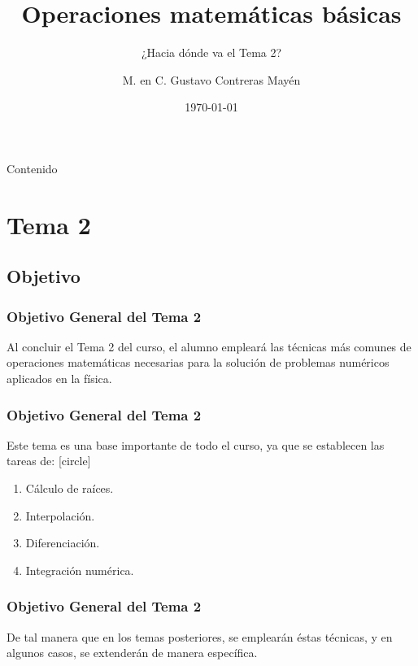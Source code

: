 



\makeatletter
\def\maketag@@@#1{\hbox{\m@th\normalfont\small#1}}
\makeatother
\title{\large{Operaciones matemáticas básicas}}
\subtitle{¿Hacia dónde va el Tema 2?}
\author{M. en C. Gustavo Contreras Mayén}
\date{\today}

\maketitle
\fontsize{14}{14}\selectfont
{}
\begin{frame}{Contenido}
\tableofcontents[pausesections]
\end{frame}
\section{Tema 2}
\subsection{Objetivo}
\begin{frame}
\frametitle{Objetivo General del Tema 2}
Al concluir el Tema 2 del curso, el alumno empleará las técnicas más comunes de operaciones matemáticas necesarias para la solución de problemas numéricos aplicados en la física.
\end{frame}
\begin{frame}
\frametitle{Objetivo General del Tema 2}
Este tema es una base importante de todo el curso, ya que se establecen las tareas de:
[circle]
\begin{enumerate}[<+->]
\item Cálculo de raíces.
\item Interpolación.
\item Diferenciación.
\item Integración numérica.
\end{enumerate}
\end{frame}
\begin{frame}
\frametitle{Objetivo General del Tema 2}
De tal manera que en los temas posteriores, se emplearán éstas técnicas, y en algunos casos, se extenderán de manera específica.
\end{frame}
